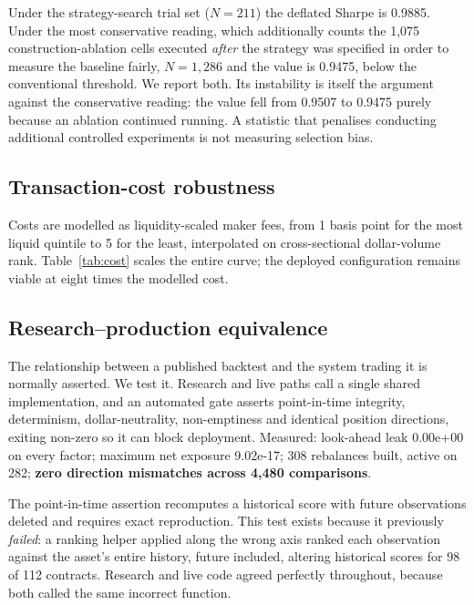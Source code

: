 \documentclass[11pt,letterpaper]{article}
\begin{document}
Under the strategy-search trial set ($N = 211$) the deflated Sharpe is 0.9885.
Under the most conservative reading, which additionally counts the 1,075
construction-ablation cells executed \emph{after} the strategy was specified in
order to measure the baseline fairly, $N = 1{,}286$ and the value is 0.9475,
below the conventional threshold. We report both. Its instability is itself the
argument against the conservative reading: the value fell from 0.9507 to 0.9475
purely because an ablation continued running. A statistic that penalises
conducting additional controlled experiments is not measuring selection bias.

\subsection{Transaction-cost robustness}

Costs are modelled as liquidity-scaled maker fees, from 1 basis point for the
most liquid quintile to 5 for the least, interpolated on cross-sectional
dollar-volume rank. Table~\ref{tab:cost} scales the entire curve; the deployed
configuration remains viable at eight times the modelled cost.

\subsection{Research--production equivalence}

The relationship between a published backtest and the system trading it is
normally asserted. We test it. Research and live paths call a single shared
implementation, and an automated gate asserts point-in-time integrity,
determinism, dollar-neutrality, non-emptiness and identical position directions,
exiting non-zero so it can block deployment. Measured: look-ahead leak
0.00e+00 on every factor; maximum net exposure 9.02e-17; 308 rebalances built,
active on 282; \textbf{zero direction mismatches across 4,480 comparisons}.

The point-in-time assertion recomputes a historical score with future
observations deleted and requires exact reproduction. This test exists because it
previously \emph{failed}: a ranking helper applied along the wrong axis ranked
each observation against the asset's entire history, future included, altering
historical scores for 98 of 112 contracts. Research and live code agreed
perfectly throughout, because both called the same incorrect function.

\end{document}
